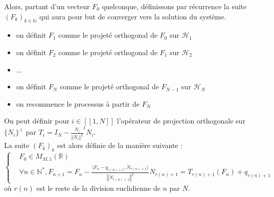 \documentclass{article}
\newcommand*{\iintervalle}[2]{[\![#1,#2]\!]}
\newcommand*{\N}{\mathbb{N}}
\newcommand*{\R}{\mathbb{R}}
\newcommand*{\scal}[2]{\langle #1, #2 \rangle}
\newcommand*{\norme}[1]{\left \Vert #1 \right \Vert}
\theoremstyle{definition}
\theoremstyle{remark}
\theoremstyle{plain}
\theoremstyle{definition}
\begin{document}
\noindent Alors, partant d'un vecteur $F_0$ quelconque, définissons par récurrence la suite $(F_k)_{k \in \N}$ qui aura pour but de converger vers la solution du système. 
\begin{itemize}
    \item on définit $F_1$ comme le projeté orthogonal de $F_0$ sur $\mathcal{H}_1$
    \item on définit $F_2$ comme le projeté orthogonal de $F_1$ sur $\mathcal{H}_2$
    \item ...
    \item on définit $F_N$ comme le projeté orthogonal de $F_{N-1}$ sur $\mathcal{H}_N$
    \item on recommence le processus à partir de $F_N$
\end{itemize}
On peut définir pour $i \in \iintervalle{1}{N}$ l'opérateur de projection orthogonale sur $\{N_i\}^{\perp}$ par $T_i = I_N - \frac{N_i}{\norme{N_i}^2}^t N_i$. \\
\noindent La suite $(F_k)_k$ est alors définie de la manière suivante : 
$$\left\{ 
    \begin{array}{ll}
        & F_0 \in M_{M,1}(\R)\\
        & \forall n \in \N^{*}, F_{n+1}= F_n - \frac{\scal{F_n - q_{r(n)+1}}{N_{r(n)+1}}}{\norme{N_{r(n)+1}}^2}N_{r(n)+1}  = T_{r(n)+1}(F_n) + q_{r(n)+1}
    \end{array}\right.$$
    où $r(n)$ est le reste de la division euclidienne de $n$ par $N$. 
\end{document}
